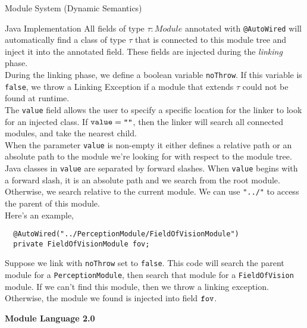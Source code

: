 \documentclass[11pt]{article}
\begin{document}
\begin{section}{Module System (Dynamic Semantics)}
\begin{subsection}{Java Implementation}
All fields of type $\tau : Module$ annotated with \verb|@AutoWired| will automatically find a class of type $\tau$ that is connected to this module tree and inject it into the annotated field. These fields are injected during the \emph{linking} phase.\\

During the linking phase, we define a boolean variable \verb|noThrow|. If this variable is \verb|false|, we throw a Linking Exception if a module that extends $\tau$ could not be found at runtime. \\

The \verb|value| field allows the user to specify a specific location for the linker to look for an injected class. If $\verb|value| = \verb|""|$, then the linker will search all connected modules, and take the nearest child.\\

When the parameter \verb|value| is non-empty it either defines a relative path or an absolute path to the module we're looking for with respect to the module tree. Java classes in \verb|value| are separated by forward slashes. When \verb|value| begins with a forward slash, it is an absolute path and we search from the root module. Otherwise, we search relative to the current module. We can use \verb|"../"| to access the parent of this module. \\

Here's an example, 
\begin{verbatim}
  @AutoWired("../PerceptionModule/FieldOfVisionModule") 
  private FieldOfVisionModule fov;
\end{verbatim}
Suppose we link with \verb|noThrow| set to \verb|false|. This code will search the parent module for a \verb|PerceptionModule|, then search that module for a \verb|FieldOfVision| module. If we can't find this module, then we throw a linking exception. Otherwise, the module we found is injected into field $\verb|fov|$.

\end{subsection}
\end{section}
\setcounter{section}{0}
\begin{center}\textbf{\LARGE Module Language 2.0} \end{center}
\end{document}
